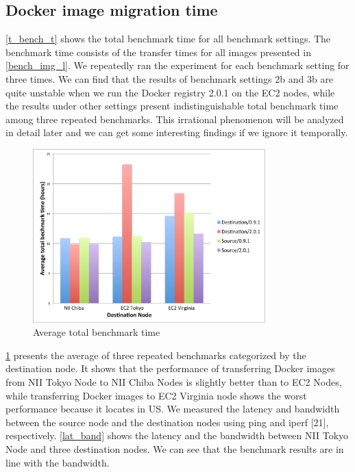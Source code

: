 \documentclass{ieicej}
\begin{document}
\subsection{Docker image migration time}
\cref{t_bench_t} shows the total benchmark time for all benchmark settings. The benchmark time consists of the transfer times for all images presented in \cref{bench_img_l}.
We repeatedly ran the experiment for each benchmark setting for three times.
We can find that the results of benchmark settings 2b and 3b are quite unstable when we run the Docker registry 2.0.1 on the EC2 nodes, while the results under other settings present indistinguishable total benchmark time among three repeated benchmarks.
This irrational phenomenon will be analyzed in detail later and we can get some interesting findings if we ignore it temporally.

\begin{figure}
  \begin{center}
  \includegraphics[width=0.8\textwidth,natwidth=1000,natheight=800]{3_Average_total_benchmark_time.pdf}
  \end{center}
  \caption{Average total benchmark time}
  \label{avg_bench_time}
\end{figure}


\cref{avg_bench_time} presents the average of three repeated benchmarks categorized by the destination node.
It shows that the performance of transferring Docker images from NII Tokyo Node to NII Chiba Nodes is slightly better than to EC2 Nodes, while transferring Docker images to EC2 Virginia node shows the worst performance because it locates in US.
We measured the latency and bandwidth between the source node and the destination nodes using ping and iperf [21], respectively.
\cref{lat_band} shows the latency and the bandwidth between NII Tokyo Node and three destination nodes. We can see that the benchmark results are in line with the bandwidth.
\end{document}

